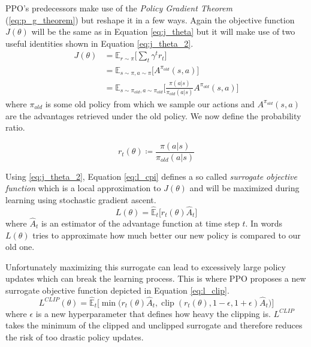 PPO's predecessors make use of the \emph{Policy Gradient Theorem} (\ref{eq:p_g_theorem}) but reshape it in a few ways.
Again the objective function $J(\theta)$ will be the same as in Equation \ref{eq:j_theta} but it will make use of two useful identities shown in Equation \ref{eq:j_theta_2}.
\begin{align}
	\label{eq:j_theta_2}
	J(\theta) &= \mathbb{E}_{r \sim \pi} \Big[\sum_t \gamma^t r_t\Big] \nonumber\\
  		      &= \mathbb{E}_{s \sim \pi, a \sim \pi}\Big[A^{\pi_{old}}(s,a)\Big] \nonumber\\
  		      &= \mathbb{E}_{s \sim \pi_{old}, a \sim \pi_{old}}\bigg[\frac{\pi(a | s)}{\pi_{old}(a | s)} A^{\pi_{old}}(s,a)\bigg]
\end{align}
where $\pi_{old}$ is some old policy from which we sample our actions and $A^{\pi_{old}}(s,a)$ are the advantages retrieved under the old policy.
We now define the probability ratio.
\begin{defn}
\begin{equation} \label{eq:prob_ratio_r}
	r_t(\theta) \coloneqq \frac{\pi(a | s)}{\pi_{old}(a | s)}
\end{equation}
\end{defn}
Using \ref{eq:j_theta_2}, Equation \ref{eq:l_cpi} defines a so called \emph{surrogate objective function} which is a local approximation to $J(\theta)$ and will be maximized during learning using stochastic gradient ascent.
\begin{equation} \label{eq:l_cpi}
	L(\theta) = \hat{\mathbb{E}}_{t}\Big[r_t(\theta) \hat{A}_t\Big]
\end{equation}
where $\hat{A}_t$ is an estimator of the advantage function at time step $t$.
In words $L(\theta)$ tries to approximate how much better our new policy is compared to our old one.


Unfortunately maximizing this surrogate can lead to excessively large policy updates which can break the learning process.
This is where PPO proposes a new surrogate objective function depicted in Equation \ref{eq:l_clip}.
\begin{equation} \label{eq:l_clip}
	L^{CLIP}(\theta) = \hat{\mathbb{E}}_{t}\bigg[\min \Big(r_t(\theta) \hat{A}_t, \operatorname*{clip}(r_t(\theta), 1 - \epsilon, 1 + \epsilon) \hat{A}_t \Big)\bigg]
\end{equation}
where $\epsilon$ is a new hyperparameter that defines how heavy the clipping is.
$L^{CLIP}$ takes the minimum of the clipped and unclipped surrogate and therefore reduces the risk of too drastic policy updates.


